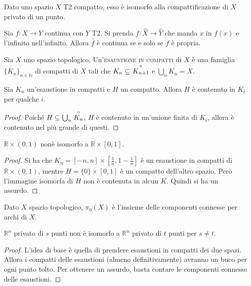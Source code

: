 \begin{cor}
    Dato uno spazio $X$ T2 compatto, esso \`e isomorfo alla compattificazione di $X$ privato di un punto.
\end{cor}

\begin{prop}
    Sia $f\colon X \longrightarrow Y$ continua con $Y$ T2. Si prenda ${\hat{f}\colon \hat{X}\longrightarrow\hat{Y}}$ che manda $x$ in $f(x)$ e l'infinito nell'infinito. Allora $\hat{f}$ \`e continua se e solo se $f$ \`e propria.
\end{prop}

\begin{defn}
    Sia $X$ uno spazio topologico. Un'\textsc{esaustione in compatti} di $X$ \`e una famiglia ${\{K_n\}_{n\in\mathbb{N}}}$ di compatti di $X$ tali che ${K_n\subseteq\ \open{K_{n+1}}}$ e $\bigcup_nK_n = X$.
\end{defn}

\begin{prop}
    Sia $K_n$ un'esaustione in compatti e $H$ un compatto. Allora $H$ \`e contenuto in $K_i$ per qualche $i$.
\end{prop}
\begin{proof}
    Poich\'e $H\subseteq \bigcup_n\stackrel{\circ}{K_n}$, $H$ \`e contenuto in un'unione finita di $K_i$, allora \`e contenuto nel pi\`u grande di questi.
\end{proof}

\begin{ex}
    $\mathbb{R}\times(0,1)$ non\`e isomorfo a $\mathbb{R}\times[0,1]$.
\end{ex}
\begin{proof}
    Si ha che $K_n = [-n,n]\times[\frac{1}{n}, 1-\frac{1}{n}]$ \`e un esaustione in compatti di $\mathbb{R}\times(0,1)$, mentre $H=\{0\}\times[0,1]$ \`e un compatto dell'altro spazio. Per\`o l'immagine isomorfa di $H$ non \`e contenuta in alcun $K$. Quindi si ha un assurdo.
\end{proof}

\begin{defn}
    Dato $X$ spazio topologico, $\pi_0(X)$ \`e l'insieme delle componenti connesse per archi di $X$.
\end{defn}

\begin{ex}
    $\mathbb{R}^n$ privato di $s$ punti non \`e isomorfo a $\mathbb{R}^n$
    privato di $t$ punti per $s\ne t$.
\end{ex}
\begin{proof}
    L'idea di base \`e quella di prendere esaustioni in compatti dei due spazi.
    Allora i compatti delle esaustioni (almeno definitivamente) avranno un buco per ogni punto tolto. Per ottenere un assurdo, basta contare le componenti connesse delle esaustioni.
\end{proof}
